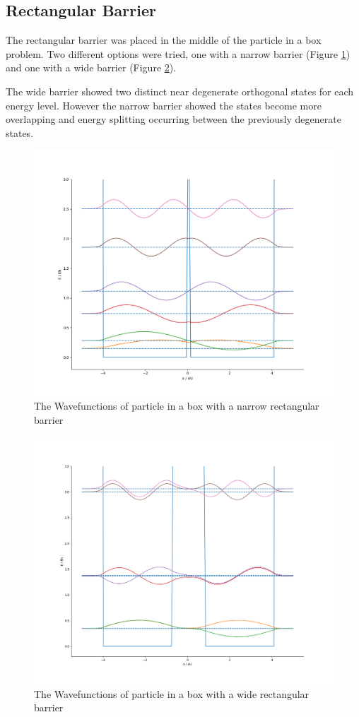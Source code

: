 \documentclass{article}
\begin{document}
\newpage
\subsection*{Rectangular Barrier}
The rectangular barrier was placed in the middle of the particle in a box problem. Two different options were tried, one with a narrow barrier (Figure \ref{fig:narbar}) and one with a wide barrier (Figure \ref{fig:widebar}). 

The wide barrier showed two distinct near degenerate orthogonal states for each energy level. However the narrow barrier showed the states become more overlapping and energy splitting occurring between the previously degenerate states.

\begin{figure}[h]
\centering
	\includegraphics[width=.6\linewidth]{images/rectnarrow.png}
	\caption{The Wavefunctions of particle in a box with a narrow rectangular barrier }
	\label{fig:narbar}
\end{figure}

\begin{figure}[h]
\centering
	\includegraphics[width=.6\linewidth]{images/rectwide.png}
	\caption{The Wavefunctions of particle in a box with a wide rectangular barrier  }
	\label{fig:widebar}
\end{figure}
\end{document}
